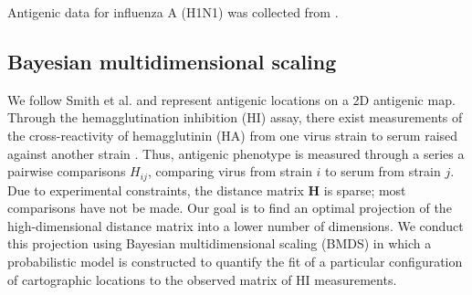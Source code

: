 \documentclass[11pt,oneside,letterpaper]{article}
\begin{document}
Antigenic data for influenza A (H1N1) was collected from \cite{Faress05,Chakraverty82,Chakraverty86,Cox83,Daniels85,Daum02,Donatelli93,Kendal78,McDonald07,Nakajima79,Nakajima81,Pereira82,Stevens87,Webster79,Raymond86}.

\subsection*{Bayesian multidimensional scaling}

We follow Smith et al. \cite{Smith04} and represent antigenic locations on a 2D antigenic map. 
Through the hemagglutination inhibition (HI) assay, there exist measurements of the cross-reactivity of hemagglutinin (HA) from one virus strain to serum raised against another strain \cite{Hirst43}. 
Thus, antigenic phenotype is measured through a series a pairwise comparisons $H_{ij}$, comparing virus from strain $i$ to serum from strain $j$. 
Due to experimental constraints, the distance matrix $\mathbf{H}$ is sparse; most comparisons have not be made. 
Our goal is to find an optimal projection of the high-dimensional distance matrix into a lower number of dimensions. 
We conduct this projection using Bayesian multidimensional scaling (BMDS) \cite{Oh01} in which a probabilistic model is constructed to quantify the fit of a particular configuration of cartographic locations to the observed matrix of HI measurements.
\end{document}
